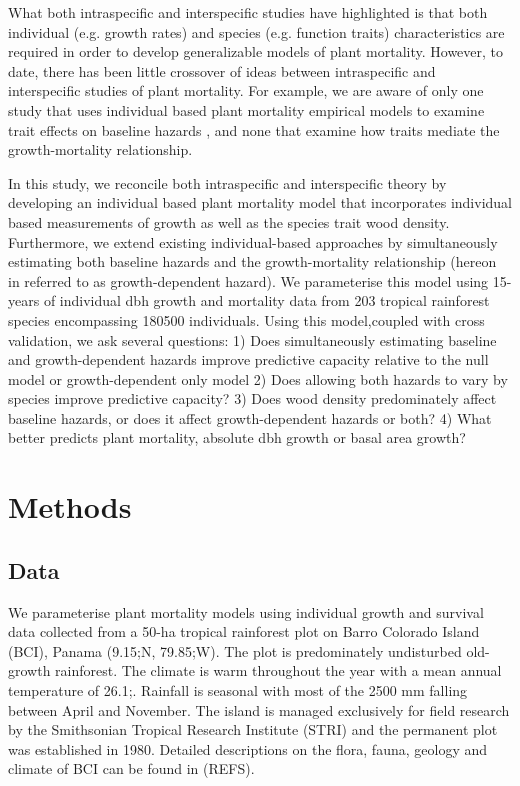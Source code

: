 \documentclass[a4paper,11pt]{article}\usepackage[]{graphicx}\usepackage[]{color}
\begin{document}
What both intraspecific and interspecific studies have highlighted is that both individual (e.g. growth rates) and species (e.g. function traits) characteristics are required in order to develop generalizable models of plant mortality. However, to date, there has been little crossover of ideas between intraspecific and interspecific studies of plant mortality. For example, we are aware of only one study that uses individual based plant mortality empirical models to examine trait effects on baseline hazards \citep{AubryKientz:2013dg}, and none that examine how traits mediate the growth-mortality relationship.

In this study, we reconcile both intraspecific and interspecific theory by developing an individual based plant mortality model that incorporates individual based measurements of growth as well as the species trait wood density. Furthermore, we extend existing individual-based approaches \citep[e.g.][]{Kobe:1995tw} by simultaneously estimating both baseline hazards and the growth-mortality relationship (hereon in referred to as growth-dependent hazard). We parameterise this model using 15-years of individual dbh growth and mortality data from 203 tropical rainforest species encompassing 180500 individuals. Using this model,coupled with cross validation, we ask several questions: 1) Does simultaneously estimating baseline and growth-dependent hazards improve predictive capacity relative to the null model or growth-dependent only model 2) Does allowing both hazards to vary by species improve predictive capacity? 3) Does wood density predominately affect baseline hazards, or does it affect growth-dependent hazards or both? 4) What better predicts plant mortality, absolute dbh growth or basal area growth?

\clearpage

\section{Methods}

\subsection{Data}
We parameterise plant mortality models using individual growth and survival data collected from a 50-ha tropical rainforest plot on Barro Colorado Island (BCI), Panama (9.15\degree;N, 79.85\degree;W). The plot is predominately undisturbed old-growth rainforest. The climate is warm throughout the year with a mean annual temperature of 26.1\degree;. Rainfall is seasonal with most of the 2500 mm falling between April and November. The island is managed exclusively for field research by the Smithsonian Tropical Research Institute (STRI) and the permanent plot was established in 1980. Detailed descriptions on the flora, fauna, geology and climate of BCI can be found in (REFS).
\end{document}
